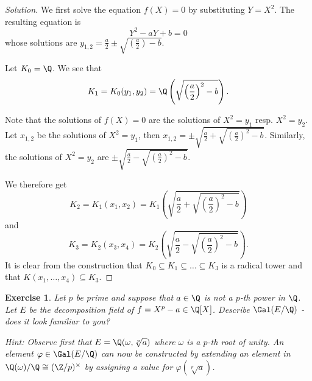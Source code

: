 \documentclass[a4paper,10pt,reqno]{amsart}
\newtheorem{ex}{Exercise}[section]
\newenvironment{sol}
  {\renewcommand\qedsymbol{$\blacksquare$}\begin{proof}[Solution]}
  {\end{proof}}
\begin{document}
\begin{sol}
    We first solve the equation $f(X) = 0$ by substituting $Y = X^2$. The resulting equation is
    \[
    Y^2 - aY + b = 0
    \]
    whose solutions are $y_{1,2} = \frac{a}{2} \pm \sqrt{\left(\frac{a}{2}\right) - b}$.
    
    Let $K_0 = \Q$. We see that
    \[
    K_1 = K_0(y_1,y_2) = \Q\left( \sqrt{\left(\frac{a}{2}\right)^2 - b} \right).
    \]

    Note that the solutions of $f(X) = 0$ are the solutions of $X^2 = y_1$ resp. $X^2 = y_2$. Let $x_{1,2}$ be the solutions of $X^2 = y_1$, then $x_{1,2} = \pm \sqrt{\frac{a}{2} + \sqrt{\left(\frac{a}{2}\right)^2 - b}}$. Similarly, the solutions of $X^2 = y_2$ are $ \pm \sqrt{\frac{a}{2} - \sqrt{\left(\frac{a}{2}\right)^2 - b}}$.

    We therefore get
    \[
    K_2 = K_1(x_1,x_2) = K_1\left( \sqrt{\frac{a}{2} + \sqrt{\left(\frac{a}{2}\right)^2 - b}} \right)
    \]
    and
    \[
    K_3 = K_2(x_3,x_4) = K_2\left( \sqrt{\frac{a}{2} - \sqrt{\left(\frac{a}{2}\right)^2 - b}} \right).
    \]
    It is clear from the construction that $K_0 \subseteq K_1 \subseteq \ldots \subseteq K_3$ is a radical tower and that $K(x_1,\ldots,x_4) \subseteq K_3$.  
\end{sol}



\begin{ex}
\label{11.2}
    Let $p$ be prime and suppose that $a \in \Q$ is \emph{not} a $p$-th power in $\Q$. Let $E$ be the decomposition field of $f = X^p-a \in \Q[X]$. Describe $\Gal(E/\Q)$ - does it look familiar to you?

    \noindent \textit{Hint:} Observe first that $E = \Q(\omega,\sqrt[p]{a})$ where $\omega$ is a $p$-th root of unity. An element $\varphi \in \Gal(E/\Q)$ can now be constructed by extending an element in $\Q(\omega)/\Q \cong (\Z/p)^{\times}$ by assigning a value for $\varphi(\sqrt[p]{a})$.
\end{ex}
\end{document}
